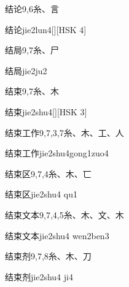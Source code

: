 \begin{Entry}{结论}{9,6}{⽷、⾔}
  \begin{Phonetics}{结论}{jie2lun4}[][HSK 4]
  \end{Phonetics}
\end{Entry}

\begin{Entry}{结局}{9,7}{⽷、⼫}
  \begin{Phonetics}{结局}{jie2ju2}
  \end{Phonetics}
\end{Entry}

\begin{Entry}{结束}{9,7}{⽷、⽊}
  \begin{Phonetics}{结束}{jie2shu4}[][HSK 3]
  \end{Phonetics}
\end{Entry}

\begin{Entry}{结束工作}{9,7,3,7}{⽷、⽊、⼯、⼈}
  \begin{Phonetics}{结束工作}{jie2shu4gong1zuo4}
  \end{Phonetics}
\end{Entry}

\begin{Entry}{结束区}{9,7,4}{⽷、⽊、⼖}
  \begin{Phonetics}{结束区}{jie2shu4 qu1}
  \end{Phonetics}
\end{Entry}

\begin{Entry}{结束文本}{9,7,4,5}{⽷、⽊、⽂、⽊}
  \begin{Phonetics}{结束文本}{jie2shu4 wen2ben3}
  \end{Phonetics}
\end{Entry}

\begin{Entry}{结束剂}{9,7,8}{⽷、⽊、⼑}
  \begin{Phonetics}{结束剂}{jie2shu4 ji4}
  \end{Phonetics}
\end{Entry}

